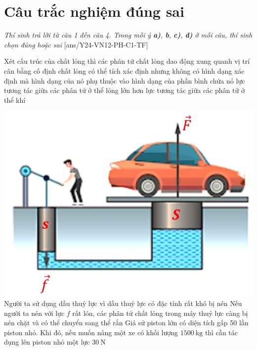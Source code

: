 \section{Câu trắc nghiệm đúng sai}
\textit{Thí sinh trả lời từ câu 1 đến câu 4. Trong mỗi ý \textbf{a)}, \textbf{b}, \textbf{c)}, \textbf{d)} ở mỗi câu, thí sinh chọn đúng hoặc sai}
\setcounter{ex}{0}
[ans/Y24-VN12-PH-C1-TF]
\begin{ex}
	Xét cấu trúc của chất lỏng thì
	{các phân tử chất lỏng dao động xung quanh vị trí cân bằng cố định}
	{\True chất lỏng có thể tích xác định nhưng không có hình dạng xác định mà hình dạng của nó phụ thuộc vào hình dạng của phần bình chứa nó}
	{\True lực tương tác giữa các phân tử ở thể lỏng lớn hơn lực tương tác giữa các phân tử ở thể khí}
	\loigiai{}
\end{ex}
\begin{ex}
	{
		\includegraphics[width=0.6\linewidth]{../figs/Y24-VN12-PH-C1-BT-1}
	}
	{Người ta sử dụng dầu thuỷ lực vì dầu thuỷ lực có đặc tính rất khó bị nén}
	{\True Nếu người ta nén với lực $f$ rất lón, các phân tử chất lỏng trong máy thuỷ lực càng bị nén chặt và có thể chuyển sang thể rắn}
	{Giả sử piston lớn có diện tích gấp 50 lần piston nhỏ. Khi đó, nếu muốn nâng một xe có khối lượng $\SI{1500}{\kilogram}$ thì cần tác dụng lên piston nhỏ một lực $\SI{30}{\newton}$}
\end{ex}
